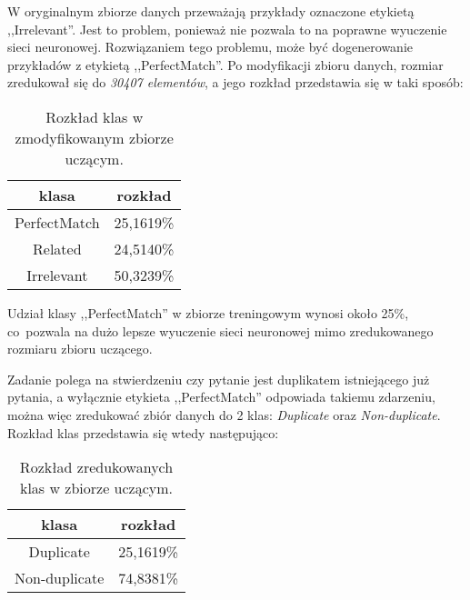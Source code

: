 W oryginalnym zbiorze danych przeważają przykłady oznaczone etykietą ,,Irrelevant''. Jest to problem, ponieważ nie pozwala to na poprawne wyuczenie sieci neuronowej. Rozwiązaniem tego problemu, może być dogenerowanie przykładów z etykietą ,,PerfectMatch''. Po modyfikacji zbioru danych, rozmiar zredukował się do \emph{30407 elementów}, a jego rozkład przedstawia się w taki sposób:

\begin{table}[H]
\caption{Rozkład klas w zmodyfikowanym zbiorze uczącym.}
\label{se_train_set_modified}
    \begin{center}
        \begin{tabular}{ |c|c| }
            \hline
            klasa & rozkład\\
            \hline
            PerfectMatch & 25,1619\% \\
            \hline
            Related & 24,5140\% \\
            \hline
            Irrelevant & 50,3239\% \\
            \hline
        \end{tabular}
    \end{center}
\end{table}

Udział klasy ,,PerfectMatch'' w zbiorze treningowym wynosi około 25\%, co~pozwala na dużo lepsze wyuczenie sieci neuronowej mimo zredukowanego rozmiaru zbioru uczącego.

Zadanie polega na stwierdzeniu czy pytanie jest duplikatem istniejącego już pytania, a wyłącznie etykieta ,,PerfectMatch'' odpowiada takiemu zdarzeniu, można więc zredukować zbiór danych do 2 klas: \emph{Duplicate} oraz \emph{Non-duplicate}. Rozkład klas przedstawia się wtedy następująco:

\begin{table}[H]
\caption{Rozkład zredukowanych klas w zbiorze uczącym.}
\label{se_train_set_reduced}
    \begin{center}
        \begin{tabular}{ |c|c| }
         \hline
         klasa & rozkład \\
         \hline
         Duplicate & 25,1619\% \\
         \hline
         Non-duplicate & 74,8381\% \\
         \hline
        \end{tabular}
    \end{center}
\end{table}

